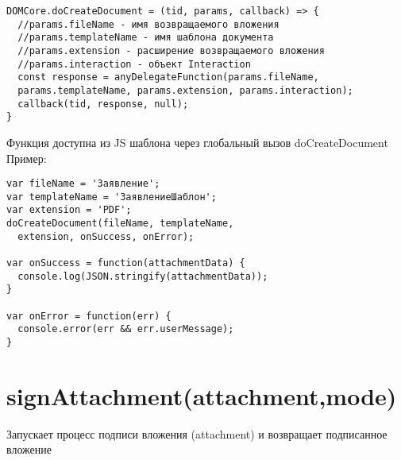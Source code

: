 \begin{verbatim}
DOMCore.doCreateDocument = (tid, params, callback) => {
  //params.fileName - имя возвращаемого вложения
  //params.templateName - имя шаблона документа
  //params.extension - расширение возвращаемого вложения
  //params.interaction - объект Interaction
  const response = anyDelegateFunction(params.fileName, 
  params.templateName, params.extension, params.interaction);
  callback(tid, response, null);
}
\end{verbatim}

Функция доступна из JS шаблона через глобальный вызов doCreateDocument
Пример:

\begin{verbatim}
var fileName = 'Заявление';
var templateName = 'ЗаявлениеШаблон';
var extension = 'PDF';
doCreateDocument(fileName, templateName, 
  extension, onSuccess, onError);

var onSuccess = function(attachmentData) {
  console.log(JSON.stringify(attachmentData));
}

var onError = function(err) {
  console.error(err && err.userMessage);
}
\end{verbatim}

\hypertarget{attachment-mode}{%
\section{signAttachment(attachment,mode)}\label{attachment-mode}}

Запускает процесс подписи вложения (attachment) и возвращает подписанное
вложение


